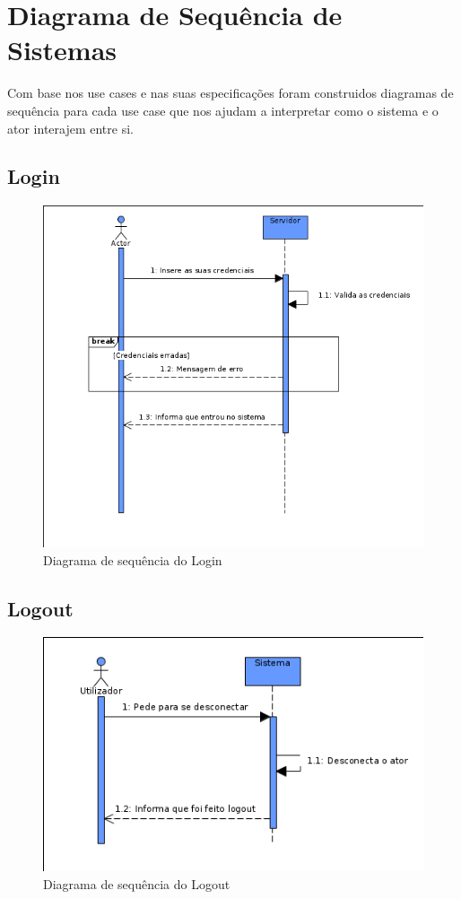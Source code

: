 \documentclass[a4paper]{report}
\begin{document}
\chapter{Diagrama de Sequência de Sistemas}

Com base nos use cases e nas suas especificações foram construidos diagramas de sequência
para cada use case que nos ajudam a interpretar como o sistema e o ator interajem entre
si.

\section{Login}

\begin{figure}[H]
	\centering 
    \includegraphics[width=\textwidth]{images/loginSeq.png}  
    \caption{Diagrama de sequência do Login}
\end{figure}

\section{Logout}

\begin{figure}[H]
	\centering 
    \includegraphics[width=\textwidth]{images/logoutSeq.png}  
    \caption{Diagrama de sequência do Logout}
\end{figure}
\end{document}
